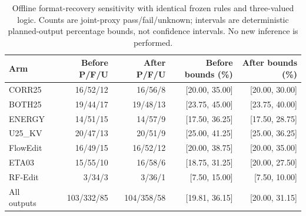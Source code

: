 \begin{table}[t]
\centering\small
\caption{Offline format-recovery sensitivity with identical frozen rules and three-valued logic. Counts are joint-proxy pass/fail/unknown; intervals are deterministic planned-output percentage bounds, not confidence intervals. No new inference is performed.}
\label{tab:recovery-counts}
\begin{tabular}{lrrrr}
\toprule
Arm & Before P/F/U & After P/F/U & Before bounds (\%) & After bounds (\%)\\
\midrule
CORR25 & 16/52/12 & 16/56/8 & [20.00, 35.00] & [20.00, 30.00]\\
BOTH25 & 19/44/17 & 19/48/13 & [23.75, 45.00] & [23.75, 40.00]\\
ENERGY & 14/51/15 & 14/57/9 & [17.50, 36.25] & [17.50, 28.75]\\
U25\_KV & 20/47/13 & 20/51/9 & [25.00, 41.25] & [25.00, 36.25]\\
FlowEdit & 16/49/15 & 16/52/12 & [20.00, 38.75] & [20.00, 35.00]\\
ETA03 & 15/55/10 & 16/58/6 & [18.75, 31.25] & [20.00, 27.50]\\
RF-Edit & 3/34/3 & 3/36/1 & [7.50, 15.00] & [7.50, 10.00]\\
\midrule
All outputs & 103/332/85 & 104/358/58 & [19.81, 36.15] & [20.00, 31.15]\\
\bottomrule
\end{tabular}
\end{table}
